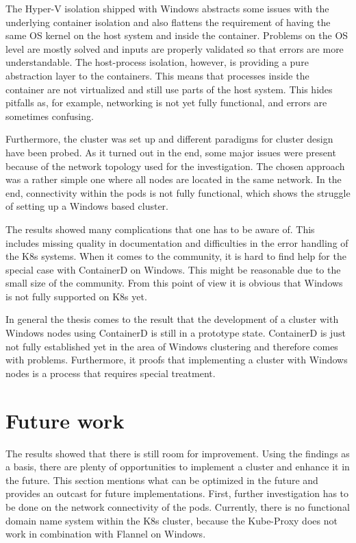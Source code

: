 The Hyper-V isolation shipped with \ac{Windows} abstracts some issues with the underlying container isolation and also flattens the requirement of having the same \ac{OS} kernel on the host system and inside the container. Problems on the \ac{OS} level are mostly solved and inputs are properly validated so that errors are more understandable.
The host-process isolation, however, is providing a pure abstraction layer to the containers. This means that processes inside the container are not virtualized and still use parts of the host system.
This hides pitfalls as, for example, networking is not yet fully functional, and errors are sometimes confusing.

Furthermore, the cluster was set up and different paradigms for cluster design have been probed. As it turned out in the end, some major issues were present because of the network topology used for the investigation. The chosen approach was a rather simple one where all nodes are located in the same network. In the end, connectivity within the pods is not fully functional, which shows the struggle of setting up a \ac{Windows} based cluster.

The results showed many complications that one has to be aware of. This includes missing quality in documentation and difficulties in the error handling of the \ac{K8s} systems. When it comes to the community, it is hard to find help for the special case with ContainerD on \ac{Windows}. This might be reasonable due to the small size of the community. From this point of view it is obvious that \ac{Windows} is not fully supported on \ac{K8s} yet.





In general the thesis comes to the result that the development of a cluster with \ac{Windows} nodes using ContainerD is still in a prototype state. ContainerD is just not fully established yet in the area of \ac{Windows} clustering and therefore comes with problems. Furthermore, it proofs that implementing a cluster with \ac{Windows} nodes is a process that requires special treatment. 


\section{Future work}
The results showed that there is still room for improvement. Using the findings as a basis, there are plenty of opportunities to implement a cluster and enhance it in the future. This section mentions what can be optimized in the future and provides an outcast for future implementations.
First, further investigation has to be done on the network connectivity of the pods. Currently, there is no functional domain name system within the \ac{K8s} cluster, because the Kube-Proxy does not work in combination with Flannel on \ac{Windows}.

